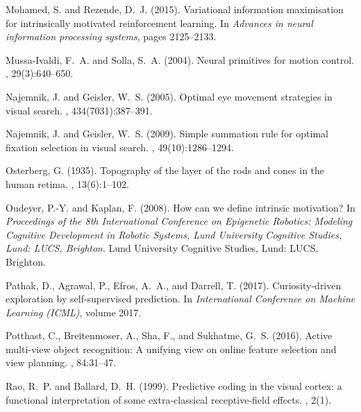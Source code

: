 \documentclass[12pt,twoside,openright]{article}
\begin{document}
\begin{thebibliography}{}
	Mohamed, S. and Rezende, D.~J. (2015).
	\newblock Variational information maximisation for intrinsically motivated
	reinforcement learning.
	\newblock In {\em Advances in neural information processing systems}, pages
	2125--2133.
	
	Mussa-Ivaldi, F.~A. and Solla, S.~A. (2004).
	\newblock Neural primitives for motion control.
	, 29(3):640--650.
	
	Najemnik, J. and Geisler, W.~S. (2005).
	\newblock Optimal eye movement strategies in visual search.
	, 434(7031):387--391.
	
	Najemnik, J. and Geisler, W.~S. (2009).
	\newblock Simple summation rule for optimal fixation selection in visual
	search.
	, 49(10):1286--1294.
	
	Osterberg, G. (1935).
	\newblock Topography of the layer of the rods and cones in the human retima.
	, 13(6):1--102.
	
	Oudeyer, P.-Y. and Kaplan, F. (2008).
	\newblock How can we define intrinsic motivation?
	\newblock In {\em Proceedings of the 8th International Conference on Epigenetic
		Robotics: Modeling Cognitive Development in Robotic Systems, Lund University
		Cognitive Studies, Lund: LUCS, Brighton}. Lund University Cognitive Studies,
	Lund: LUCS, Brighton.
	
	Pathak, D., Agrawal, P., Efros, A.~A., and Darrell, T. (2017).
	\newblock Curiosity-driven exploration by self-supervised prediction.
	\newblock In {\em International Conference on Machine Learning (ICML)}, volume
	2017.
	
	Potthast, C., Breitenmoser, A., Sha, F., and Sukhatme, G.~S. (2016).
	\newblock Active multi-view object recognition: A unifying view on online
	feature selection and view planning.
	, 84:31--47.
	
	Rao, R.~P. and Ballard, D.~H. (1999).
	\newblock Predictive coding in the visual cortex: a functional interpretation
	of some extra-classical receptive-field effects.
	, 2(1).
	

\end{thebibliography}
\end{document}
